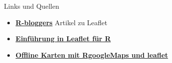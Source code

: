 \documentclass[ignorenonframetext,]{beamer}
\begin{document}
\begin{frame}{Links und Quellen}

\begin{itemize}
\item
  \href{http://www.r-bloggers.com/the-leaflet-package-for-online-mapping-in-r/}{\textbf{R-bloggers}}
  Artikel zu Leaflet
\item
  \href{https://rstudio.github.io/leaflet/}{\textbf{Einführung in
  Leaflet für R}}
\item
  \href{https://blog.hwr-berlin.de/codeandstats/category/scientific-software/r/}{\textbf{Offline
  Karten mit RgoogleMaps und leaflet}}
\end{itemize}

\end{frame}
\end{document}
